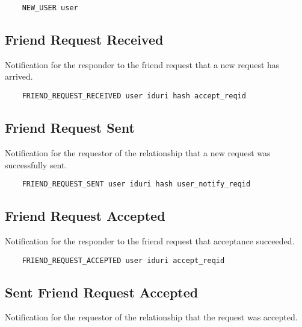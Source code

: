 \documentclass[letterpaper,11pt,oneside]{article}
\begin{document}
\vspace{10pt}
\begin{verbatim}
    NEW_USER user
\end{verbatim}
\vspace{10pt}

\subsection{Friend Request Received}

Notification for the responder to the friend request that a new request has
arrived.

\vspace{10pt}
\begin{verbatim}
    FRIEND_REQUEST_RECEIVED user iduri hash accept_reqid
\end{verbatim}
\vspace{10pt}

\subsection{Friend Request Sent}

Notification for the requestor of the relationship that a new request was
successfully sent.

\vspace{10pt}
\begin{verbatim}
    FRIEND_REQUEST_SENT user iduri hash user_notify_reqid
\end{verbatim}
\vspace{10pt}

\subsection{Friend Request Accepted}

Notification for the responder to the friend request that acceptance succeeded.

\vspace{10pt}
\begin{verbatim}
    FRIEND_REQUEST_ACCEPTED user iduri accept_reqid
\end{verbatim}
\vspace{10pt}

\subsection{Sent Friend Request Accepted}

Notification for the requestor of the relationship that the request was
accepted.
\end{document}
